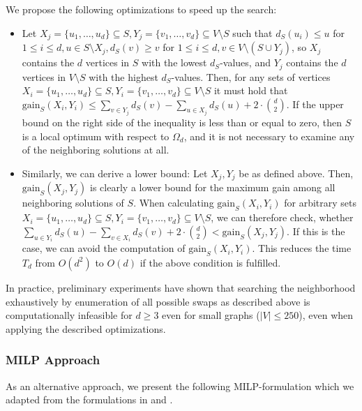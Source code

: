 \documentclass[draft,final]{vutinfth} %
\begin{document}
We propose the following optimizations to speed up the search: 
\begin{itemize}
    \item Let $X_j = \{u_1, \dots, u_d\} \subseteq S, Y_j = \{v_1, \dots, v_d\} \subseteq V \setminus S$ such that $d_S(u_i) \leq u$ for $1 \leq i \leq d, u \in S \setminus X_j, d_S(v) \geq v$ for $1 \leq i \leq d, v \in V \setminus (S \cup Y_j)$, so $X_j$ contains the $d$ vertices in $S$ with the lowest $d_S$-values, and $Y_j$ contains the $d$ vertices in $V\setminus S$ with the highest $d_S$-values.  
    Then, for any sets of vertices $X_i = \{u_1, \dots, u_d\} \subseteq S, Y_i = \{v_1, \dots, v_d\} \subseteq V \setminus S$ it must hold that $\mathrm{gain}_S(X_i, Y_i) \leq \sum_{v \in Y_j} d_S(v) - \sum_{u \in X_j} d_S(u) + 2 \cdot \binom{d}{2}$. If the upper bound on the right side of the inequality is less than or equal to zero, then $S$ is a local optimum with respect to $\Omega_d$, and it is not necessary to examine any of the neighboring solutions at all. 
    \item Similarly, we can derive a lower bound: Let $X_j, Y_j$ be as defined above. Then, $\mathrm{gain}_S(X_j, Y_j)$ is clearly a lower bound for the maximum gain among all neighboring solutions of $S$. When calculating $\mathrm{gain}_S(X_i, Y_i)$ for arbitrary sets $X_i = \{u_1, \dots, u_d\} \subseteq S, Y_i = \{v_1, \dots, v_d\} \subseteq V \setminus S$, we can therefore check, whether $\sum_{u \in Y_i} d_S(u) - \sum_{v \in X_i} d_S(v) + 2 \cdot \binom{d}{2} < \mathrm{gain}_S(X_j, Y_j)$. If this is the case, we can avoid the computation of $\mathrm{gain}_S(X_i, Y_i)$. This reduces the time $T_d$ from $O(d^2)$ to $O(d)$ if the above condition is fulfilled. 
\end{itemize}

In practice, preliminary experiments have shown that searching the neighborhood exhaustively by enumeration of all possible swaps as described above is computationally infeasible for $d \geq 3$ even for small graphs ($|V| \leq 250$), even when applying the described optimizations. 

\subsubsection{MILP Approach}

As an alternative approach, we present the following MILP-formulation which we adapted from the formulations in \cite{pattillo_maximum_2013} and \cite{VeremyevPBP16}.
 
\end{document}
